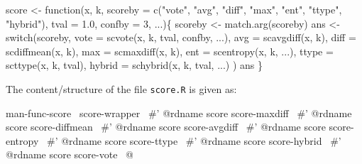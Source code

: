 \documentclass[a4paper]{article}
\begin{document}
\nwenddocs{}\endmoddef
score <- function(x, k,
                  scoreby = c("vote", "avg", "diff", "max", "ent",
                              "ttype", "hybrid"),
                  tval = 1.0, confby = 3, ...)\{
    scoreby <- match.arg(scoreby)
    ans <- switch(scoreby,
                  vote = scvote(x, k, tval, confby, ...),
                  avg = scavgdiff(x, k),
                  diff = scdiffmean(x, k),
                  max = scmaxdiff(x, k),
                  ent = scentropy(x, k, ...),
                  ttype = scttype(x, k, tval),
                  hybrid = schybrid(x, k, tval, ...)
                  )
    ans
\}
\eatline
{}\nwendcode{}%

The content/structure of the file \texttt{score.R} is given as:

\nwenddocs{}\endmoddef\let\nwnotused=\nwoutput{}
\LA{}man-func-score~{\nwtagstyle{}}\RA{}
\LA{}score-wrapper~{\nwtagstyle{}}\RA{}
#' @rdname score
\LA{}score-maxdiff~{\nwtagstyle{}}\RA{}
#' @rdname score
\LA{}score-diffmean~{\nwtagstyle{}}\RA{}
#' @rdname score
\LA{}score-avgdiff~{\nwtagstyle{}}\RA{}
#' @rdname score
\LA{}score-entropy~{\nwtagstyle{}}\RA{}
#' @rdname score
\LA{}score-ttype~{\nwtagstyle{}}\RA{}
#' @rdname score
\LA{}score-hybrid~{\nwtagstyle{}}\RA{}
#' @rdname score
\LA{}score-vote~{\nwtagstyle{}}\RA{}
\nwnotused{score.R}\nwendcode{}@
\end{document}
